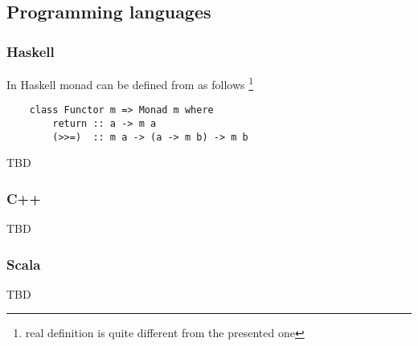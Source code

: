 \subsection{Programming languages}

\subsubsection{Haskell}

In Haskell monad can be defined from  as follows 
\footnote{real definition is quite different from the presented one}
\begin{example}
\label{ex:monad_haskell}
\begin{verbatim}
    class Functor m => Monad m where
        return :: a -> m a
        (>>=)  :: m a -> (a -> m b) -> m b
\end{verbatim} 
\end{example}

TBD

\subsubsection{C++}

TBD

\subsubsection{Scala}

TBD
